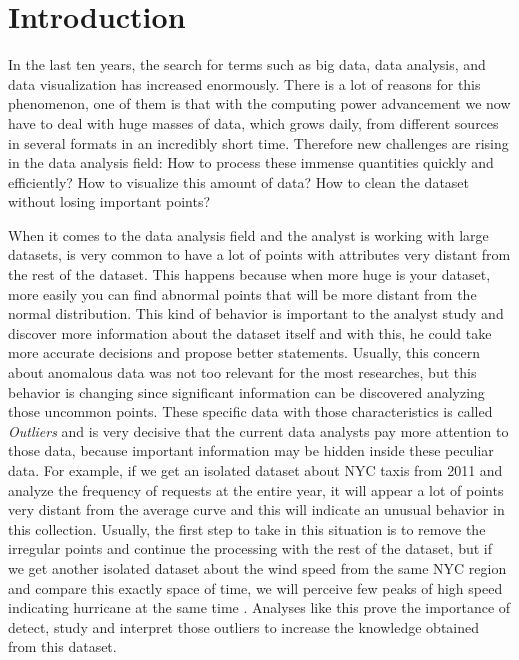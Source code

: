 \chapter{Introduction}


In the last ten years, the search for terms such as big data, data analysis, and data visualization has increased enormously. There is a lot of reasons for this phenomenon, one of them is that with the computing power advancement we now have to deal with huge masses of data, which grows daily, from different sources in several formats in an incredibly short time. Therefore new challenges are rising in the data analysis field: How to process these immense quantities quickly and efficiently? How to visualize this amount of data? How to clean the dataset without losing important points?

When it comes to the data analysis field and the analyst is working with large datasets, is very common to have a lot of points with attributes very distant from the rest of the dataset. This happens because when more huge is your dataset, more easily you can find abnormal points that will be more distant from the normal distribution. This kind of behavior is important to the analyst study and discover more information about the dataset itself and with this, he could take more accurate decisions and propose better statements. Usually, this concern about anomalous data was not too relevant for the most researches, but this behavior is changing since significant information can be discovered analyzing those uncommon points. These specific data with those characteristics is called \textit{Outliers} and is very decisive that the current data analysts pay more attention to those data, because important information may be hidden inside these peculiar data. For example, if we get an isolated dataset about NYC taxis from 2011 and analyze the frequency of requests at the entire year, it will appear a lot of points very distant from the average curve and this will indicate an unusual behavior in this collection. Usually, the first step to take in this situation is to remove the irregular points and continue the processing with the rest of the dataset, but if we get another isolated dataset about the wind speed from the same NYC region and compare this exactly space of time, we will perceive few peaks of high speed indicating hurricane at the same time \cite{DBLP:journals/debu/FreireCVZ16}. Analyses like this prove the importance of detect, study and interpret those outliers to increase the knowledge obtained from this dataset.

